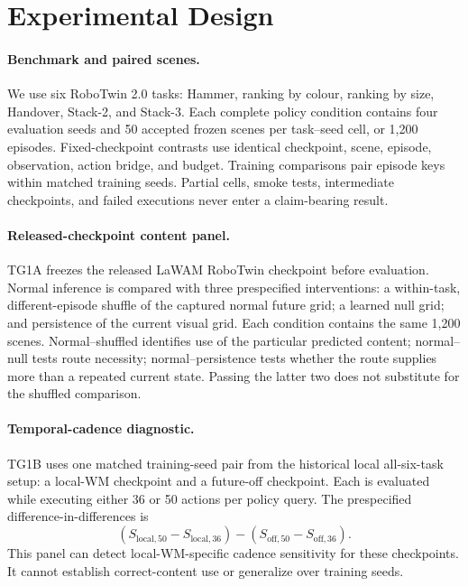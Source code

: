 \section{Experimental Design}\label{sec:design}

\paragraph{Benchmark and paired scenes.}
We use six RoboTwin 2.0 tasks: Hammer, ranking by colour, ranking by size,
Handover, Stack-2, and Stack-3.  Each complete policy condition contains four
evaluation seeds and 50 accepted frozen scenes per task--seed cell, or 1,200
episodes.  Fixed-checkpoint contrasts use identical checkpoint, scene, episode,
observation, action bridge, and budget.  Training comparisons pair episode keys
within matched training seeds.  Partial cells, smoke tests, intermediate
checkpoints, and failed executions never enter a claim-bearing result.

\paragraph{Released-checkpoint content panel.}
TG1A freezes the released LaWAM RoboTwin checkpoint before evaluation.  Normal
inference is compared with three prespecified interventions: a within-task,
different-episode shuffle of the captured normal future grid; a learned null
grid; and persistence of the current visual grid.  Each condition contains the
same 1,200 scenes.  Normal--shuffled identifies use of the particular predicted
content; normal--null tests route necessity; normal--persistence tests whether
the route supplies more than a repeated current state.  Passing the latter two
does not substitute for the shuffled comparison.

\paragraph{Temporal-cadence diagnostic.}
TG1B uses one matched training-seed pair from the historical local all-six-task
setup: a local-WM checkpoint and a future-off checkpoint.  Each is evaluated
while executing either 36 or 50 actions per policy query.  The prespecified
difference-in-differences is
\begin{equation}
 (S_{\mathrm{local},50}-S_{\mathrm{local},36})-
 (S_{\mathrm{off},50}-S_{\mathrm{off},36}).
\end{equation}
This panel can detect local-WM-specific cadence sensitivity for these
checkpoints.  It cannot establish correct-content use or generalize over
training seeds.

